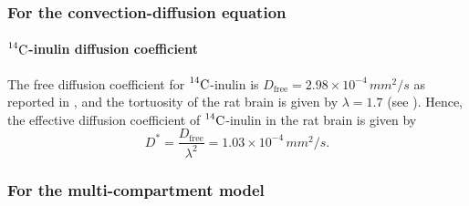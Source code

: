 \documentclass[10pt]{article}
\newcommand{\1}{^{(1)}}
\newcommand{\2}{^{(2)}}
\newcommand{\Cinulin}{$\prescript{14}{}{\text{C}}$-inulin }
\begin{document}
\subsubsection{For the convection-diffusion equation}

\paragraph{\Cinulin diffusion coefficient}
The free diffusion coefficient for \Cinulin is $ D_\text{free} = 2.98 \times 10^{-4} \, \si{mm^2/s}$ as reported in \cite{lanman1971diffusion}, and the tortuosity of the rat brain is given by $ \lambda=1.7 $ (see \cite{Waters-2011-AB}). Hence, the effective diffusion coefficient of \Cinulin in the rat brain is given by
\[ 
  D^{*} = \frac{D_\text{free}}{\lambda^2} = 1.03\times 10^{-4} \, \si{mm^2/s}.
\]


\subsubsection{For the multi-compartment model}
\end{document}
